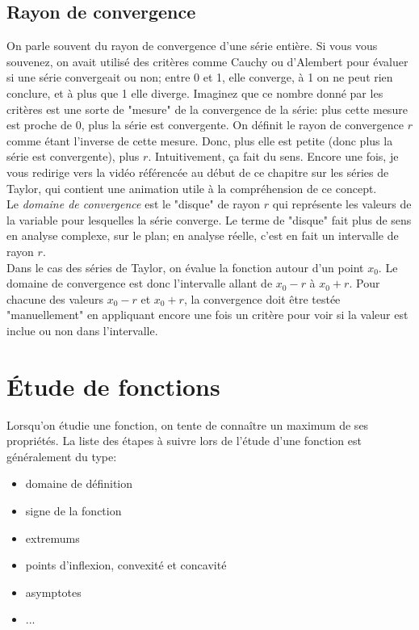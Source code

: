 \documentclass{article}
\begin{document}
\subsection{Rayon de convergence}
On parle souvent du rayon de convergence d'une série entière. Si vous vous souvenez, on avait utilisé des critères comme Cauchy ou d'Alembert pour évaluer si une série convergeait ou non; entre 0 et 1, elle converge, à 1 on ne peut rien conclure, et à plus que 1 elle diverge. Imaginez que ce nombre donné par les critères est une sorte de "mesure" de la convergence de la série: plus cette mesure est proche de 0, plus la série est convergente. On définit le rayon de convergence \(r\) comme étant l'inverse de cette mesure. Donc, plus elle est petite (donc plus la série est convergente), plus \(r\). Intuitivement, ça fait du sens. Encore une fois, je vous redirige vers la vidéo référencée au début de ce chapitre sur les séries de Taylor, qui contient une animation utile à la compréhension de ce concept. \\

Le \emph{domaine de convergence} est le "disque" de rayon \(r\) qui représente les valeurs de la variable pour lesquelles la série converge. Le terme de "disque" fait plus de sens en analyse complexe, sur le plan; en analyse réelle, c'est en fait un intervalle de rayon \(r\). \\

Dans le cas des séries de Taylor, on évalue la fonction autour d'un point \(x_0\). Le domaine de convergence est donc l'intervalle allant de \(x_0-r\) à \(x_0+r\). Pour chacune des valeurs \(x_0-r\) et \(x_0+r\), la convergence doit être testée "manuellement" en appliquant encore une fois un critère pour voir si la valeur est inclue ou non dans l'intervalle.


\section{Étude de fonctions}
Lorsqu'on étudie une fonction, on tente de connaître un maximum de ses propriétés. La liste des étapes à suivre lors de l'étude d'une fonction est généralement du type:
\begin{itemize}
	\item domaine de définition
	\item signe de la fonction
	\item extremums
	\item points d'inflexion, convexité et concavité
	\item asymptotes
	\item ... %
\end{itemize}
\end{document}
